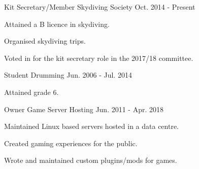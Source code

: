 

\begin{cventries}

  \cventry
    {Kit Secretary/Member} %
    {Skydiving Society} %
    {} %
    {Oct. 2014 - Present} %
    {
      \begin{cvmitems} %
        \item {Attained a B licence in skydiving.}
        \item {Organised skydiving trips.}
        \item {Voted in for the kit secretary role in the 2017/18 committee.}
      \end{cvmitems}
    }

  \cventry
    {Student} %
    {Drumming} %
    {} %
    {Jun. 2006 - Jul. 2014} %
    {
      \begin{cvitems} %
        \item {Attained grade 6.}
      \end{cvitems}
    }

  \cventry
    {Owner} %
    {Game Server Hosting} %
    {} %
    {Jun. 2011 - Apr. 2018} %
    {
      \begin{cvmitems} %
        \item {Maintained Linux based servers hosted in a data centre.}
        \item {Created gaming experiences for the public.}
        \item {Wrote and maintained custom plugins/mods for games.}
      \end{cvmitems}
    }

\end{cventries}
